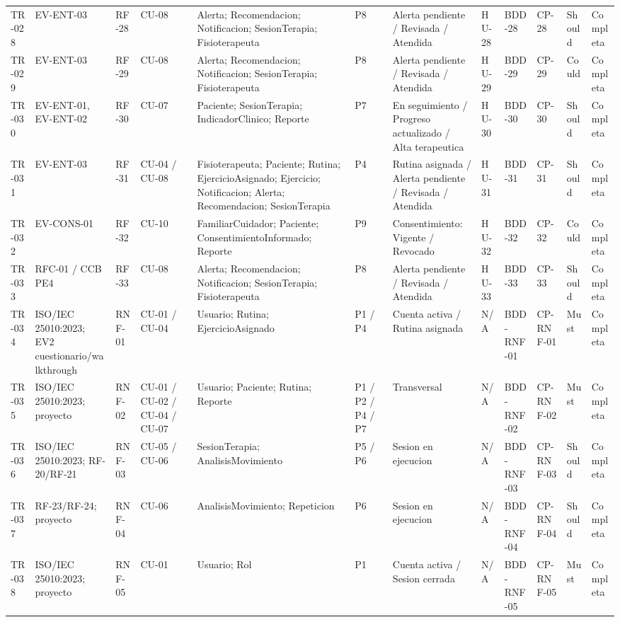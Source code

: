 \documentclass[12pt,a4paper]{article}
\begin{document}
\begin{landscape}
\begin{longtable}{p{0.9cm}p{2.5cm}p{1.7cm}p{1.8cm}p{3.6cm}p{1.6cm}p{3.0cm}p{1.6cm}p{1.8cm}p{1.8cm}p{1.4cm}p{1.5cm}}
TR-028 & EV-ENT-03 & RF-28 & CU-08 & Alerta; Recomendacion; Notificacion; SesionTerapia; Fisioterapeuta & P8 & Alerta pendiente / Revisada / Atendida & HU-28 & BDD-28 & CP-28 & Should & Completa \\
TR-029 & EV-ENT-03 & RF-29 & CU-08 & Alerta; Recomendacion; Notificacion; SesionTerapia; Fisioterapeuta & P8 & Alerta pendiente / Revisada / Atendida & HU-29 & BDD-29 & CP-29 & Could & Completa \\
TR-030 & EV-ENT-01, EV-ENT-02 & RF-30 & CU-07 & Paciente; SesionTerapia; IndicadorClinico; Reporte & P7 & En seguimiento / Progreso actualizado / Alta terapeutica & HU-30 & BDD-30 & CP-30 & Should & Completa \\
TR-031 & EV-ENT-03 & RF-31 & CU-04 / CU-08 & Fisioterapeuta; Paciente; Rutina; EjercicioAsignado; Ejercicio; Notificacion; Alerta; Recomendacion; SesionTerapia & P4 & Rutina asignada / Alerta pendiente / Revisada / Atendida & HU-31 & BDD-31 & CP-31 & Should & Completa \\
TR-032 & EV-CONS-01 & RF-32 & CU-10 & FamiliarCuidador; Paciente; ConsentimientoInformado; Reporte & P9 & Consentimiento: Vigente / Revocado & HU-32 & BDD-32 & CP-32 & Could & Completa \\
TR-033 & RFC-01 / CCB PE4 & RF-33 & CU-08 & Alerta; Recomendacion; Notificacion; SesionTerapia; Fisioterapeuta & P8 & Alerta pendiente / Revisada / Atendida & HU-33 & BDD-33 & CP-33 & Should & Completa \\
TR-034 & ISO/IEC 25010:2023; EV2 cuestionario/walkthrough & RNF-01 & CU-01 / CU-04 & Usuario; Rutina; EjercicioAsignado & P1 / P4 & Cuenta activa / Rutina asignada & N/A & BDD-RNF-01 & CP-RNF-01 & Must & Completa \\
TR-035 & ISO/IEC 25010:2023; proyecto & RNF-02 & CU-01 / CU-02 / CU-04 / CU-07 & Usuario; Paciente; Rutina; Reporte & P1 / P2 / P4 / P7 & Transversal & N/A & BDD-RNF-02 & CP-RNF-02 & Must & Completa \\
TR-036 & ISO/IEC 25010:2023; RF-20/RF-21 & RNF-03 & CU-05 / CU-06 & SesionTerapia; AnalisisMovimiento & P5 / P6 & Sesion en ejecucion & N/A & BDD-RNF-03 & CP-RNF-03 & Should & Completa \\
TR-037 & RF-23/RF-24; proyecto & RNF-04 & CU-06 & AnalisisMovimiento; Repeticion & P6 & Sesion en ejecucion & N/A & BDD-RNF-04 & CP-RNF-04 & Should & Completa \\
TR-038 & ISO/IEC 25010:2023; proyecto & RNF-05 & CU-01 & Usuario; Rol & P1 & Cuenta activa / Sesion cerrada & N/A & BDD-RNF-05 & CP-RNF-05 & Must & Completa \\

\end{longtable}
\end{landscape}
\end{document}
